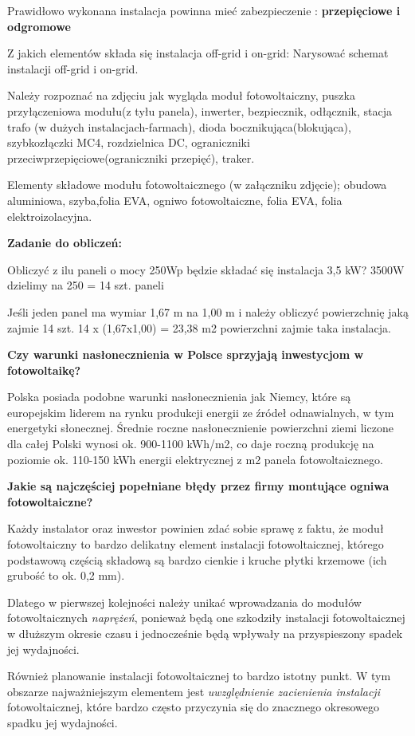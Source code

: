 \documentclass[12pt,a4paper]{article}
\begin{document}
Prawidłowo wykonana instalacja powinna mieć zabezpieczenie : \textbf{przepięciowe i odgromowe}


Z jakich elementów składa się instalacja off-grid i on-grid: 
Narysować schemat instalacji off-grid i on-grid.


Należy rozpoznać na zdjęciu jak wygląda moduł fotowoltaiczny, puszka przyłączeniowa modułu(z tyłu panela), inwerter, bezpiecznik, odłącznik, stacja trafo (w dużych instalacjach-farmach), dioda bocznikująca(blokująca), szybkozłączki MC4, rozdzielnica DC, ograniczniki przeciwprzepięciowe(ograniczniki przepięć), traker.


Elementy składowe modułu fotowoltaicznego (w załączniku zdjęcie); obudowa aluminiowa, szyba,folia EVA, ogniwo fotowoltaiczne, folia EVA, folia elektroizolacyjna.

\textbf{Zadanie do obliczeń:}

Obliczyć z ilu paneli o mocy 250Wp będzie składać się instalacja 3,5 kW?
3500W dzielimy na 250 = 14 szt. paneli

Jeśli jeden panel ma wymiar 1,67 m na 1,00 m i należy obliczyć powierzchnię jaką zajmie 14 szt.  14 x (1,67x1,00) = 23,38 m2 powierzchni zajmie taka instalacja.

\textbf{Czy warunki nasłonecznienia w Polsce sprzyjają inwestycjom w fotowoltaikę?}

Polska posiada podobne warunki nasłonecznienia jak Niemcy, które są europejskim liderem na rynku produkcji energii ze źródeł odnawialnych, w tym energetyki słonecznej.  Średnie roczne nasłonecznienie powierzchni ziemi liczone dla całej Polski wynosi ok. 900-1100 kWh/m2, co daje roczną produkcję na poziomie ok. 110-150 kWh energii elektrycznej z m2 panela fotowoltaicznego.

\textbf{Jakie są najczęściej popełniane błędy przez firmy montujące ogniwa fotowoltaiczne?}
 
 Każdy instalator oraz inwestor powinien zdać sobie sprawę z faktu, że moduł fotowoltaiczny to bardzo delikatny element instalacji fotowoltaicznej, którego podstawową częścią  składową są bardzo cienkie i kruche płytki krzemowe (ich grubość to ok. 0,2 mm).
 
Dlatego w pierwszej kolejności należy unikać wprowadzania do modułów fotowoltaicznych \textit{naprężeń}, ponieważ będą one szkodziły instalacji fotowoltaicznej w dłuższym okresie czasu i jednocześnie będą wpływały na przyspieszony spadek jej wydajności.
 
Również planowanie instalacji fotowoltaicznej to bardzo istotny punkt. W tym obszarze najważniejszym elementem jest \textit{uwzględnienie zacienienia instalacji} fotowoltaicznej, które bardzo często przyczynia się do znacznego okresowego spadku jej wydajności.
 
\end{document}
